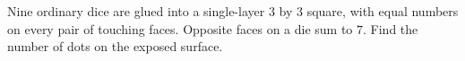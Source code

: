 Nine ordinary dice are glued into a single-layer $3$ by $3$ square, with equal numbers on every pair of touching faces. Opposite faces on a die sum to $7$. Find the number of dots on the exposed surface.
